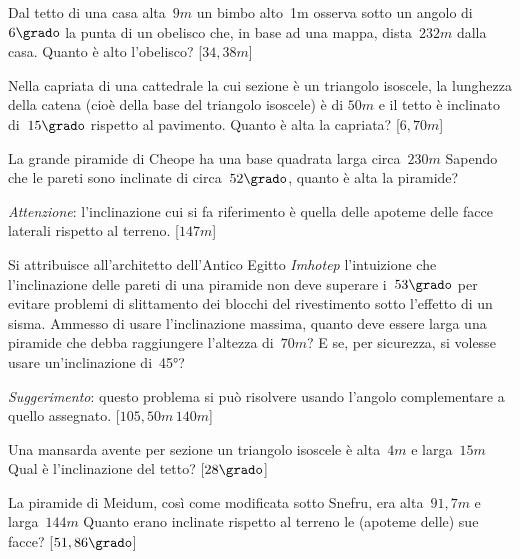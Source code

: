 \begin{multicols}{2}
\begin{esercizio}[\Ast]
\label{ese:G.56}
Dal tetto di una casa alta~\(9\unit{m}\) un bimbo alto~1m osserva sotto un angolo 
di~\(6\grado\) la punta di un obelisco che,
in base ad una mappa, dista~\(232\unit{m}\) dalla casa. Quanto è alto l'obelisco?
\hfill [\(34,38\unit{m}\)]
\end{esercizio}

\begin{esercizio}[\Ast]
\label{ese:G.57}
Nella capriata di una cattedrale la cui sezione è un triangolo isoscele, la 
lunghezza della catena (cioè della base del triangolo isoscele) è di
\(50\unit{m}\) e il tetto è inclinato di~\(15\grado\) rispetto al pavimento. Quanto 
è alta la capriata?
\hfill [\(6,70\unit{m}\)]
\end{esercizio}

\begin{esercizio}[\Ast]
\label{ese:G.58}
La grande piramide di Cheope ha una base quadrata larga circa~\(230\unit{m}\) 
Sapendo che le pareti sono inclinate di circa~\(52\grado\),
quanto è alta la piramide?

\emph{Attenzione}: l'inclinazione cui si fa riferimento è quella delle apoteme 
delle facce laterali rispetto al terreno.
\hfill [\(147\unit{m}\)]
\end{esercizio}

\begin{esercizio}[\Ast]
\label{ese:G.59}
Si attribuisce all'architetto dell'Antico Egitto \emph{Imhotep} l'intuizione che 
l'inclinazione delle pareti di una piramide non deve superare
i~\(53\grado\) per evitare problemi di slittamento dei blocchi del rivestimento 
sotto l'effetto di un sisma. Ammesso di usare
l'inclinazione massima, quanto deve essere larga una piramide che debba 
raggiungere l'altezza di~\(70\unit{m}\)?
E se, per sicurezza, si volesse usare un'inclinazione di~45°?

\emph{Suggerimento}: questo problema si può risolvere usando l'angolo 
complementare a quello assegnato.
\hfill [\(105,50\unit{m}\)\,\(140\unit{m}\)]
\end{esercizio}

\begin{esercizio}[\Ast]
\label{ese:G.60}
Una mansarda avente per sezione un triangolo isoscele è alta~\(4\unit{m}\) e 
larga~\(15\unit{m}\) Qual è l'inclinazione del tetto?
\hfill [\(28\grado\)]
\end{esercizio}

\begin{esercizio}[\Ast]
\label{ese:G.61}
La piramide di Meidum, così come modificata sotto Snefru, era 
alta~\(91,7\unit{m}\) e larga~\(144\unit{m}\)
Quanto erano inclinate rispetto al terreno le (apoteme delle) sue facce?
\hfill [\(51,86\grado\)]
\end{esercizio}


\end{multicols}
